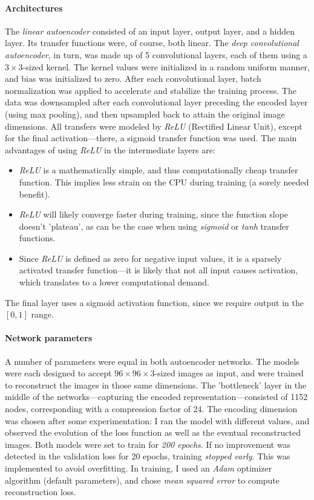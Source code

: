 \paragraph{Architectures} The \textit{linear autoencoder} consisted of an input layer, output layer, and a hidden layer. Its transfer functions were, of course, both linear. The \textit{deep convolutional autoencoder}, in turn, was made up of 5 convolutional layers, each of them using a $3 \times 3$-sized kernel. The kernel values were initialized in a random uniform manner, and bias was initialized to zero. After each convolutional layer, batch normalization was applied to accelerate and stabilize the training process. The data was downsampled after each convolutional layer preceding the encoded layer (using max pooling), and then upsampled back to attain the original image dimensions. All transfers were modeled by \textit{ReLU} (Rectified Linear Unit), except for the final activation---there, a sigmoid transfer function was used. The main advantages of using \textit{ReLU} in the intermediate layers are:

\begin{itemize}

	\item{\textit{ReLU} is a mathematically simple, and thus computationally cheap transfer function. This implies less strain on the CPU during training (a sorely needed benefit).}
	\item{\textit{ReLU} will likely converge faster during training, since the function slope doesn't 'plateau', as can be the case when using \textit{sigmoid} or \textit{tanh} transfer functions.}
	\item{Since \textit{ReLU} is defined as zero for negative input values, it is a sparsely activated transfer function---it is likely that not all input causes activation, which translates to a lower computational demand.}

\end{itemize}

The final layer uses a sigmoid activation function, since we require output in the $[0, 1]$ range.

\paragraph{Network parameters} A number of parameters were equal in both autoencoder networks. The models were each designed to accept $96\times96\times3$-sized images as input, and were trained to reconstruct the images in those same dimensions. The 'bottleneck' layer in the middle of the networks---capturing the encoded representation---consisted of 1152 nodes, corresponding with a compression factor of 24. The encoding dimension was chosen after some experimentation: I ran the model with different values, and observed the evolution of the loss function as well as the eventual reconstructed images. Both models were set to train for \textit{200 epochs}. If no improvement was detected in the validation loss for 20 epochs, training \textit{stopped early}. This was implemented to avoid overfitting. In training, I used an \textit{Adam} optimizer algorithm (default parameters), and chose \textit{mean squared error} to compute reconstruction loss. 

